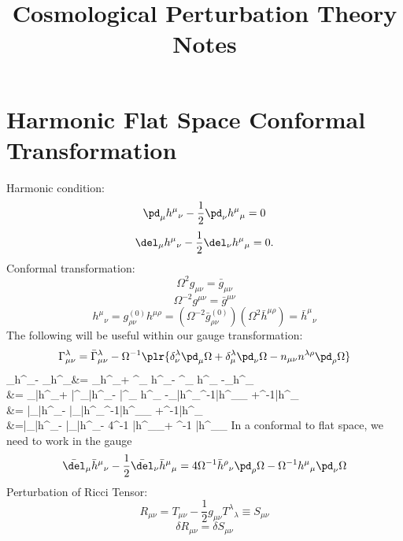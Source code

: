 \documentclass[10pt,letterpaper]{article}
\title{Cosmological Perturbation Theory Notes}
\author{}
\date{}
\begin{document}
\section*{Harmonic Flat Space Conformal Transformation}
Harmonic condition:
\[
	\pd_\mu h^\mu{}_\nu - \frac12 \pd_\nu h^\mu{}_\mu=0
\]
\[
	\del_\mu h^\mu{}_\nu - \frac12 \del_\nu h^\mu{}_\mu=0.
\]
Conformal transformation:
\[
	\Omega^2 g_{\mu\nu} = \bar g_{\mu\nu}
\]
\[
	 \Omega^{-2} g^{\mu\nu}=\bar g^{\mu\nu} 
\]
\[
	h^\mu{}_\nu = g^{(0)}_{\rho\nu} h^{\mu\rho} = (\Omega^{-2} \bar g^{(0)}_{\rho\nu}) (\Omega^2 \bar h^{\mu\rho} ) = \bar h^\mu{}_\nu
\]
The following will be useful within our gauge transformation:
\[
	\Gamma^{\lambda}_{\mu\nu} = \bar\Gamma^{\lambda}_{\mu\nu} -  \Omega^{-1}\plr{ \delta^\lambda_\nu \pd_\mu \Omega + \delta^\lambda_\mu \pd_\nu \Omega - n_{\mu\nu}n^{\lambda\rho}\pd_\rho \Omega}
\]
\ba
	\del_\mu h^\mu{}_\nu -  \del_\nu h^\mu{}_\mu&= \pd_\mu h^\mu{}_\nu + \Gamma^\mu_{\mu\rho} h^\rho{}_\nu - \Gamma^\rho_{\mu\nu} h^\mu{}_\rho
	-\pd_\nu h^\mu{}_\mu\\
	&= \pd_\mu \bar h^\mu{}_\nu + \bar \Gamma^\mu_{\mu\rho}\bar  h^\rho{}_\nu - \bar \Gamma^\rho_{\mu\nu} h^\mu{}_\rho
	-\pd_\nu \bar h^\mu{}_\Omega^{-1}\bar h^\rho{}_\nu \pd_\rho\Omega 
	+\Omega^{-1}\bar h^{\mu}{}_\rho \plr{ \delta^\rho_\nu \pd_\mu\Omega + \delta^\rho_\mu \pd_\nu\Omega - \eta^{\rho\alpha}\eta_{\mu\nu}\pd_\alpha\Omega} \\
	&= \bar\del_\mu\bar h^{\mu}{}_\nu -  \bar \del_\nu \bar h^\mu{}_\Omega^{-1}\bar h^\rho{}_\nu \pd_\rho\Omega 
	+\Omega^{-1}\bar h^{\mu}{}_\rho \plr{ \delta^\rho_\nu \pd_\mu\Omega + \delta^\rho_\mu \pd_\nu\Omega - \eta^{\rho\alpha}\eta_{\mu\nu}\pd_\alpha\Omega}\\
	&=\bar \del_\mu \bar h^\mu{}_\nu -  \bar \del_\nu \bar h^\mu{}_\mu - 4\Omega^{-1} \bar h^\rho{}_\nu  \pd_\rho \Omega + \Omega^{-1} \bar h^\mu{}_\mu \pd_\nu \Omega
\ea
In a conformal to flat space, we need to work in the gauge 
\[
	 \bar \del_\mu \bar h^\mu{}_\nu - \frac12 \bar \del_\nu \bar h^\mu{}_\mu = 4\Omega^{-1} \bar h^\rho{}_\nu  \pd_\rho \Omega - \Omega^{-1} h^\mu{}_\mu \pd_\nu \Omega
\]
Perturbation of Ricci Tensor:
\[
	R_{\mu\nu} = T_{\mu\nu} -\frac12g_{\mu\nu}T^\lambda{}_\lambda \equiv S_{\mu\nu}
\]
\[
	\delta R_{\mu\nu} = \delta S_{\mu\nu}
\]
\end{document}
